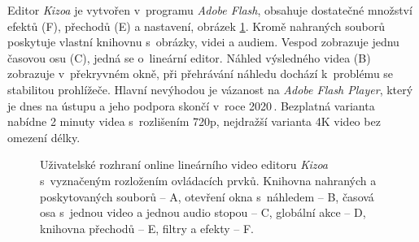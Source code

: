 Editor \textit{Kizoa} je vytvořen v~programu \textit{Adobe Flash}, obsahuje dostatečné množství efektů (F), přechodů (E) a nastavení, obrázek \ref{img:kizoa}. Kromě nahraných souborů poskytuje vlastní knihovnu s~obrázky, videi a audiem. Vespod zobrazuje jednu časovou osu (C), jedná se o~lineární editor. Náhled výsledného videa (B) zobrazuje v~překryvném okně, při přehrávání náhledu dochází k~problému se stabilitou prohlížeče. Hlavní nevýhodou je vázanost na \textit{Adobe Flash Player}, který je dnes na ústupu a jeho podpora skončí v~roce 2020\,\cite{FlashPlayer}. Bezplatná varianta nabídne 2 minuty videa s~rozlišením 720p, nejdražší varianta 4K video bez omezení délky.
\begin{figure}[h]
	\centering
	\caption{Uživatelské rozhraní online lineárního video editoru \textit{Kizoa} s~vyznačeným rozložením ovládacích prvků. Knihovna nahraných a poskytovaných souborů -- A, otevření okna s~náhledem -- B, časová osa s~jednou video a jednou audio stopou -- C, globální akce -- D, knihovna přechodů -- E, filtry a efekty -- F.}\label{img:kizoa}
\end{figure}

